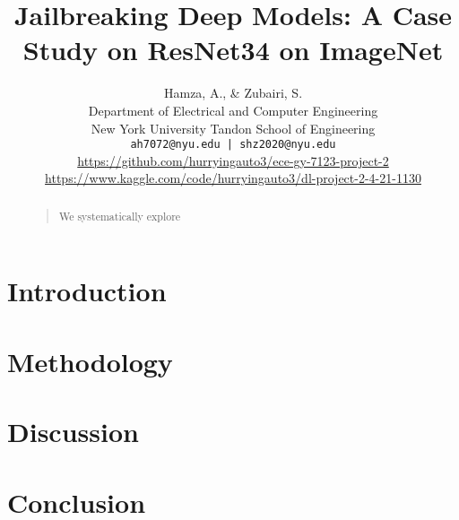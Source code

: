\documentclass[letterpaper]{article}
\begin{document}
\title{Jailbreaking Deep Models: A Case Study on ResNet34 on ImageNet}

\author{Hamza, A., \& Zubairi, S. \\
Department of Electrical and Computer Engineering\\
New York University Tandon School of Engineering\\
\texttt{ah7072@nyu.edu | shz2020@nyu.edu}\\
\url{https://github.com/hurryingauto3/ece-gy-7123-project-2}\\
\url{https://www.kaggle.com/code/hurryingauto3/dl-project-2-4-21-1130}
}
\maketitle

\begin{abstract}
    \begin{quote}
    We systematically explore
    \end{quote}
    \end{abstract}

\section{Introduction}

\section{Methodology}


\section{Discussion}

\section{Conclusion}



\end{document}
